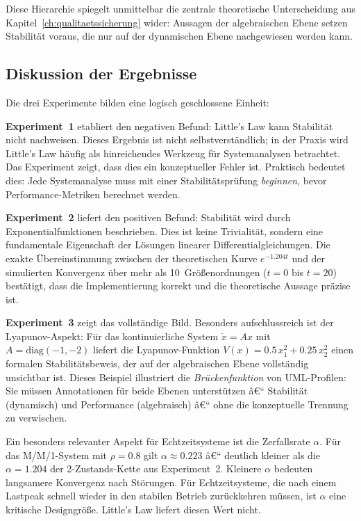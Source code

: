 ﻿\documentclass[a4paper,12pt]{report}
\theoremstyle{definition}
\begin{document}
Diese Hierarchie spiegelt unmittelbar die zentrale theoretische Unterscheidung aus Kapitel~\ref{ch:qualitaetssicherung} wider: Aussagen der algebraischen Ebene setzen Stabilität voraus, die nur auf der dynamischen Ebene nachgewiesen werden kann.

\subsection{Diskussion der Ergebnisse}
\label{subsubsec:ergebnisse-diskussion}

Die drei Experimente bilden eine logisch geschlossene Einheit:

\textbf{Experiment~1} etabliert den negativen Befund: Little's Law
kann Stabilität nicht nachweisen.  Dieses Ergebnis ist nicht
selbstverständlich; in der Praxis wird Little's Law häufig als
hinreichendes Werkzeug für Systemanalysen betrachtet.  Das Experiment
zeigt, dass dies ein konzeptueller Fehler ist.  Praktisch bedeutet
dies: Jede Systemanalyse muss mit einer Stabilitätsprüfung
\emph{beginnen}, bevor Performance-Metriken berechnet werden.

\textbf{Experiment~2} liefert den positiven Befund: Stabilität wird
durch Exponentialfunktionen beschrieben.  Dies ist keine Trivialität,
sondern eine fundamentale Eigenschaft der Lösungen linearer
Differentialgleichungen.  Die exakte Übereinstimmung zwischen der
theoretischen Kurve $e^{-1.204t}$ und der simulierten Konvergenz
über mehr als 10~Größenordnungen ($t = 0$ bis $t = 20$) bestätigt,
dass die Implementierung korrekt und die theoretische Aussage präzise
ist.

\textbf{Experiment~3} zeigt das vollständige Bild.  Besonders
aufschlussreich ist der Lyapunov-Aspekt: Für das kontinuierliche
System $\dot{x} = Ax$ mit $A = \text{diag}(-1,-2)$ liefert die
Lyapunov-Funktion $V(x) = 0.5\,x_1^2 + 0.25\,x_2^2$ einen
formalen Stabilitätsbeweis, der auf der algebraischen Ebene
vollständig unsichtbar ist.  Dieses Beispiel illustriert die
\emph{Brückenfunktion} von UML-Profilen: Sie müssen Annotationen
für beide Ebenen unterstützen â€“ Stabilität (dynamisch) und
Performance (algebraisch) â€“ ohne die konzeptuelle Trennung zu
verwischen.

Ein besonders relevanter Aspekt für Echtzeitsysteme ist die
Zerfallsrate $\alpha$.  Für das M/M/1-System mit $\rho = 0.8$ gilt
$\alpha \approx 0.223$ â€“ deutlich kleiner als die $\alpha = 1.204$
der 2-Zustands-Kette aus Experiment~2.  Kleinere $\alpha$ bedeuten
langsamere Konvergenz nach Störungen.  Für Echtzeitsysteme, die
nach einem Lastpeak schnell wieder in den stabilen Betrieb zurückkehren
müssen, ist $\alpha$ eine kritische Designgröße.  Little's Law
liefert diesen Wert nicht.
\end{document}
